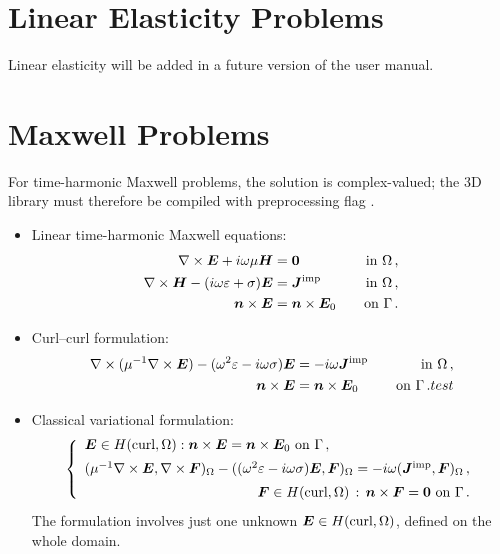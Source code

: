 \section{Linear Elasticity Problems}
\label{sec:elasticity}


Linear elasticity will be added in a future version of the user manual.

\section{Maxwell Problems}
\label{sec:maxwell}

For time-harmonic Maxwell problems, the solution is complex-valued; the \hp3D library must therefore be compiled with preprocessing flag .

\begin{itemize}
\item
{
Linear time-harmonic Maxwell equations:
\begin{alignat*}{3}
	\nabla \times \boldsymbol E + i \omega \mu \boldsymbol H
	&= \boldsymbol 0 &\quad \text{in } \Omega \, , \\
	\nabla \times \boldsymbol H - (i \omega \varepsilon + \sigma) \boldsymbol E 
	&= \boldsymbol J^{\text{imp}} &\quad \text{in } \Omega \, , \\
	\boldsymbol n \times \boldsymbol E &= \boldsymbol n \times \boldsymbol E_0 &\quad \text{on } \Gamma \, .
\end{alignat*}
}
\item
{
Curl--curl formulation:
\begin{alignat*}{3}
	\nabla \times (\mu^{-1} \nabla \times \boldsymbol E) - (\omega^2 \varepsilon - i \omega \sigma) \boldsymbol E
	&= -i \omega \boldsymbol J^{\text{imp}}  &\quad \text{in } \Omega \, , \\
	\boldsymbol n \times \boldsymbol E &= \boldsymbol n \times \boldsymbol E_0 &\quad \text{on } \Gamma \, .
	test
\end{alignat*}
}
\item
{
Classical variational formulation:
\[
\left\{
\begin{array}{lll}
	\bs E \in \Hcurl : \bs n \times \bs E = \bs n \times \bs E_0 \text{ on } \Gamma \, , \\[5pt]
	(\mu^{-1} \curl \bs E,\curl \bs F)_\Omega - ((\omega^2 \eps - i \omega \sigma) \bs E, \bs F)_\Omega
	= -i \omega (\bs J^{\text{imp}}, \bs F)_\Omega \, , \\[5pt]
	\hfill
	\quad \bs F \in \Hcurl \, : \, \bs n \times \bs F = \bs 0 \text{ on } \Gamma \, .
\end{array}
\right.
\]
The formulation involves just one unknown $\boldsymbol E \in H(\text{curl}, \Omega)$, defined on the whole domain.
}
\end{itemize}

